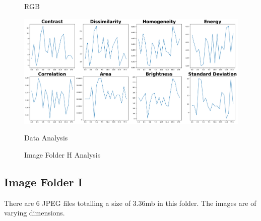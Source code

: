 \begin{figure}[ht]
\begin{minipage}[t]{0.25\textwidth}
        \caption*{RGB}
    \end{minipage}\hfill
    \begin{minipage}[t]{0.50\textwidth}
        \centering
        \includegraphics[width=\textwidth]{Figures/EDA_Charts/9/da.png}
        \caption*{Data Analysis}
    \end{minipage}
    \caption{Image Folder H Analysis}
    \label{fig:Image Folder H Analysis}
\end{figure}

\newpage

\subsection{Image Folder I}

There are 6 JPEG files totalling a size of 3.36mb in this folder. The images are of varying dimensions.

